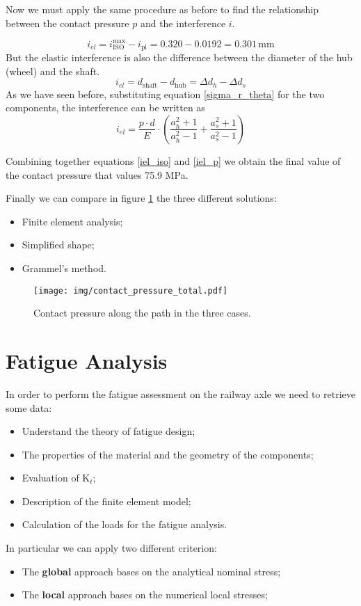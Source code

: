 \documentclass[a4paper,12pt]{article}
\begin{document}
Now we must apply the same procedure as before to find the relationship between the contact pressure $p$ and the interference $i$.

\begin{equation}
\label{iel_iso}
i_{el} = i^{\text{max}}_{\text{ISO}} - i_{\text{pl}} = 0.320 - 0.0192 = 0.301\,\text{mm}
\end{equation}
But the elastic interference is also the difference between the diameter of the hub (wheel) and the shaft.
\begin{equation}
i_{el} = d_{\text{shaft}} - d_{\text{hub}} = \Delta d_h - \Delta d_s
\end{equation}
As we have seen before, substituting equation \ref{sigma_r_theta} for the two components, the interference can be written as
\begin{equation}
\label{iel_p}
i_{el} = \frac{p \cdot d}{E} \cdot \left( \frac{a_h^2+1}{a_h^2-1} + \frac{a_s^2+1}{a_s^2-1} \right)
\end{equation}

Combining together equations \ref{iel_iso} and \ref{iel_p} we obtain the final value of the contact pressure that values 75.9 MPa.

Finally we can compare in figure \ref{fig:contact_pressure_total} the three different solutions:
\begin{itemize}
\item Finite element analysis;
\item Simplified shape;
\item Grammel's method.
\end{itemize}

\begin{figure}[H]
\centering
\caption{Contact pressure along the path in the three cases.}
\texttt{[image: img/contact\_pressure\_total.pdf]}
\label{fig:contact_pressure_total}
\end{figure}


\section{Fatigue Analysis}

In order to perform the fatigue assessment on the railway axle we need to retrieve some data:
\begin{itemize}
\item Understand the theory of fatigue design;
\item The properties of the material and the geometry of the components;
\item Evaluation of $\text{K}_t$;
\item Description of the finite element model;
\item Calculation of the loads for the fatigue analysis.
\end{itemize}
%
In particular we can apply two different criterion:
\begin{itemize}
\item The \textbf{global} approach bases on the analytical nominal stress;
\item The \textbf{local} approach bases on the numerical local stresses;
\end{itemize}
\end{document}
